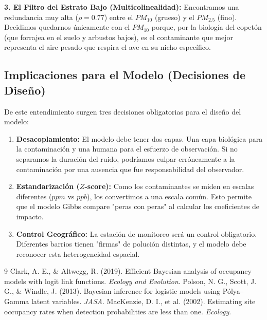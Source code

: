 \documentclass[12pt]{article}
\begin{document}
\textbf{3. El Filtro del Estrato Bajo (Multicolinealidad):}
Encontramos una redundancia muy alta ($\rho = 0.77$) entre el $PM_{10}$ (grueso) y el $PM_{2.5}$ (fino). Decidimos quedarnos únicamente con el \textbf{$PM_{10}$} porque, por la biología del copetón (que forrajea en el suelo y arbustos bajos), es el contaminante que mejor representa el aire pesado que respira el ave en su nicho específico.

\subsection*{Implicaciones para el Modelo (Decisiones de Diseño)}

De este entendimiento surgen tres decisiones obligatorias para el diseño del modelo:
\begin{enumerate}[leftmargin=*]
    \item \textbf{Desacoplamiento:} El modelo debe tener dos capas. Una capa biológica para la contaminación y una humana para el esfuerzo de observación. Si no separamos la duración del ruido, podríamos culpar erróneamente a la contaminación por una ausencia que fue responsabilidad del observador.
    \item \textbf{Estandarización ($Z$-score):} Como los contaminantes se miden en escalas diferentes ($ppm$ vs $ppb$), los convertimos a una escala común. Esto permite que el modelo Gibbs compare "peras con peras" al calcular los coeficientes de impacto.
    \item \textbf{Control Geográfico:} La estación de monitoreo será un control obligatorio. Diferentes barrios tienen "firmas" de polución distintas, y el modelo debe reconocer esta heterogeneidad espacial.
\end{enumerate}

\begin{thebibliography}{9}
 Clark, A. E., \& Altwegg, R. (2019). Efficient Bayesian analysis of occupancy models with logit link functions. \textit{Ecology and Evolution}.
 Polson, N. G., Scott, J. G., \& Windle, J. (2013). Bayesian inference for logistic models using Pólya–Gamma latent variables. \textit{JASA}.
 MacKenzie, D. I., et al. (2002). Estimating site occupancy rates when detection probabilities are less than one. \textit{Ecology}.
\end{thebibliography}
\end{document}
